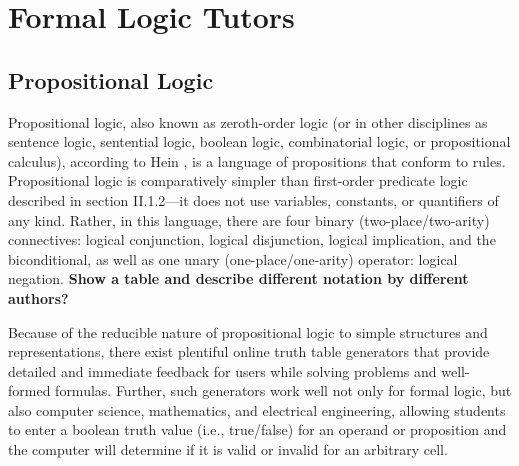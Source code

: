 \documentclass[ms]{uncgdissertationexp2}
\theoremstyle{plain}
\theoremstyle{definition}
\theoremstyle{remark}
\begin{document}
\section{Formal Logic Tutors}
\subsection{Propositional Logic}
Propositional logic, also known as zeroth-order logic (or in other disciplines as sentence logic, sentential logic, boolean logic, combinatorial logic, or propositional calculus), according to Hein \cite{hein}, is a language of propositions that conform to rules. Propositional logic is comparatively simpler than first-order predicate logic described in section II.1.2---it does not use variables, constants, or quantifiers of any kind. Rather, in this language, there are four binary (two-place/two-arity) connectives: logical conjunction, logical disjunction, logical implication, and the biconditional, as well as one unary (one-place/one-arity) operator: logical negation. \textbf{Show a table and describe different notation by different authors?}
        
Because of the reducible nature of propositional logic to simple structures and representations, there exist plentiful online truth table generators that provide detailed and immediate feedback for users while solving problems and well-formed formulas. Further, such generators work well not only for formal logic, but also computer science, mathematics, and electrical engineering, allowing students to enter a boolean truth value (i.e., true/false) for an operand or proposition and the computer will determine if it is valid or invalid for an arbitrary cell. 
\end{document}
